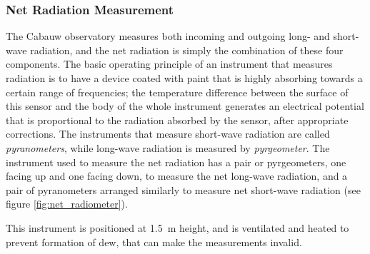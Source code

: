 \documentclass[a4paper]{book}
\begin{document}
\subsubsection{Net Radiation Measurement}
The Cabauw observatory measures both incoming and outgoing long- and short-wave radiation, and the net radiation is simply the combination of these four components. The basic operating principle of an instrument that measures radiation is to have a device coated with paint that is highly absorbing towards a certain range of frequencies; the temperature difference between the surface of this sensor and the body of the whole instrument generates an electrical potential that is proportional to the radiation absorbed by the sensor, after appropriate corrections.  The instruments that measure short-wave radiation are called \emph{pyranometers}, while long-wave radiation is measured by \emph{pyrgeometer}.  The instrument used to measure the net radiation has a pair or pyrgeometers, one facing up and one facing down, to measure the net long-wave radiation, and a pair of pyranometers arranged similarly to measure net short-wave radiation (see figure \ref{fig:net_radiometer}).

This instrument is positioned at \SI{1.5}{\meter} height, and is ventilated and heated to prevent formation of dew, that can make the measurements invalid.
\end{document}

